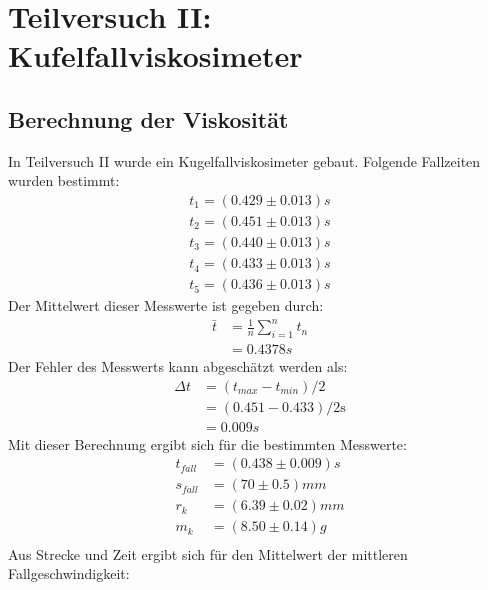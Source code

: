 \documentclass{report}
\begin{document}
\newpage
\section{Teilversuch II: Kufelfallviskosimeter}
\subsection{Berechnung der Viskosität}
In Teilversuch II wurde ein Kugelfallviskosimeter gebaut.
Folgende Fallzeiten wurden bestimmt:
\begin{equation*}
    \begin{split}
        t_1 = (0.429 \pm 0.013)s \\
        t_2 = (0.451 \pm 0.013)s \\
        t_3 = (0.440 \pm 0.013)s \\
        t_4 = (0.433 \pm 0.013)s \\
        t_5 = (0.436 \pm 0.013)s
    \end{split}
\end{equation*}
Der Mittelwert dieser Messwerte ist gegeben durch:
\begin{equation}
    \begin{split}
        \bar{t} &= \frac{1}{n} \sum_{i=1}^{n} t_n \\
                &= 0.4378s
    \end{split}
\end{equation}
Der Fehler des Messwerts kann abgeschätzt werden als:
\begin{equation}
    \begin{split}
        \Delta t &= (t_{max} - t_{min})/2 \\
                 &= (0.451-0.433)/2 \si{\s} \\
                 &= 0.009s
    \end{split}
\end{equation}
Mit dieser Berechnung ergibt sich für die bestimmten Messwerte:
\begin{equation}
    \begin{split}
        t_{fall} &= (0.438 \pm 0.009)s\\
        s_{fall} &= (70 \pm 0.5)mm \\
        r_k &= (6.39 \pm 0.02)mm \\
        m_k &= (8.50 \pm 0.14)g \\
    \end{split}
\end{equation}
Aus Strecke und Zeit ergibt sich für den Mittelwert der mittleren Fallgeschwindigkeit:
\end{document}
